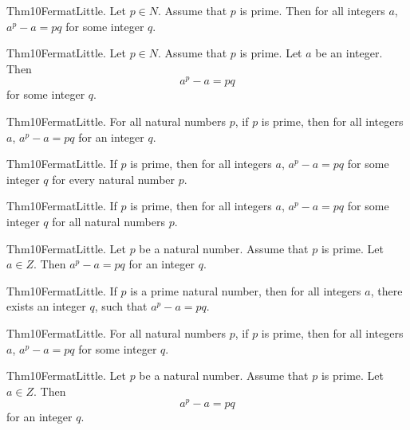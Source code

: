 \documentclass{article}
\begin{document}
Thm10FermatLittle. Let $p \in N$. Assume that $p$ is prime. Then for all integers $a$, $a ^ {p}- a = p q$ for some integer $q$.

Thm10FermatLittle. Let $p \in N$. Assume that $p$ is prime. Let $a$ be an integer. Then $$a ^ {p}- a = p q$$ for some integer $q$.

Thm10FermatLittle. For all natural numbers $p$, if $p$ is prime, then for all integers $a$, $a ^ {p}- a = p q$ for an integer $q$.

Thm10FermatLittle. If $p$ is prime, then for all integers $a$, $a ^ {p}- a = p q$ for some integer $q$ for every natural number $p$.

Thm10FermatLittle. If $p$ is prime, then for all integers $a$, $a ^ {p}- a = p q$ for some integer $q$ for all natural numbers $p$.

Thm10FermatLittle. Let $p$ be a natural number. Assume that $p$ is prime. Let $a \in Z$. Then $a ^ {p}- a = p q$ for an integer $q$.

Thm10FermatLittle. If $p$ is a prime natural number, then for all integers $a$, there exists an integer $q$, such that $a ^ {p}- a = p q$.

Thm10FermatLittle. For all natural numbers $p$, if $p$ is prime, then for all integers $a$, $a ^ {p}- a = p q$ for some integer $q$.

Thm10FermatLittle. Let $p$ be a natural number. Assume that $p$ is prime. Let $a \in Z$. Then $$a ^ {p}- a = p q$$ for an integer $q$.
\end{document}
